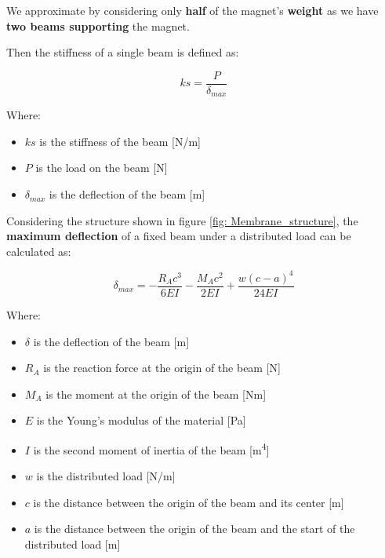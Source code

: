 We approximate by considering only \textbf{half} of the magnet's \textbf{weight} as we have \textbf{two beams supporting} the magnet.

\begin{samepage}
    Then the stiffness of a single beam is defined as:
    \nopagebreak

    \begin{equation}
        ks = \frac{P}{\delta_{max}}
    \end{equation}
    \nopagebreak

    Where:
    \nopagebreak

    \begin{itemize}
        \item $ks$ is the stiffness of the beam [N/m]
        \item $P$ is the load on the beam [N]
        \item $\delta_{max}$ is the deflection of the beam [m]
    \end{itemize}
\end{samepage}

\begin{samepage}
    Considering the structure shown in figure \ref{fig: Membrane_structure}, the \textbf{maximum deflection} of a fixed beam under a distributed load can be calculated as:
    \nopagebreak

    \begin{equation}
        \label{eq: Beam_deflection}
        \delta_{max} = -\frac{R_A c^3}{6 E I} - \frac{M_A c^2}{2EI} + \frac{w (c-a)^4}{24 EI}
    \end{equation}
    \nopagebreak

    Where:
    \nopagebreak

    \begin{itemize}
        \item $\delta$ is the deflection of the beam [m]
        \item $R_A$ is the reaction force at the origin of the beam [N]
        \item $M_A$ is the moment at the origin of the beam [Nm]
        \item $E$ is the Young's modulus of the material [Pa]
        \item $I$ is the second moment of inertia of the beam [m\textsuperscript{4}]
        \item $w$ is the distributed load [N/m]
        \item $c$ is the distance between the origin of the beam and its center [m]
        \item $a$ is the distance between the origin of the beam and the start of the distributed load [m]
    \end{itemize}
\end{samepage}

